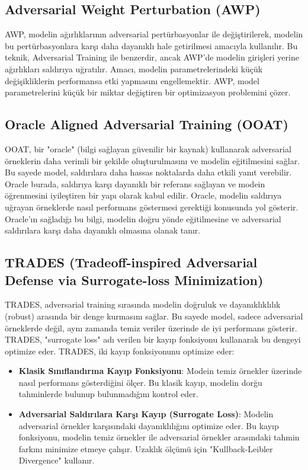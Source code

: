 \newpage

\subsection{Adversarial Weight Perturbation (AWP)}

AWP, modelin ağırlıklarının adversarial pertürbasyonlar ile değiştirilerek, modelin bu pertürbasyonlara karşı daha dayanıklı hale getirilmesi amacıyla kullanılır. Bu teknik, Adversarial Training ile benzerdir, ancak AWP'de modelin girişleri yerine ağırlıkları saldırıya uğratılır. Amacı, modelin parametrelerindeki küçük değişikliklerin performansa etki yapmasını engellemektir. AWP, model parametrelerini küçük bir miktar değiştiren bir optimizasyon problemini çözer.

\newpage

\subsection{Oracle Aligned Adversarial Training (OOAT)}

OOAT, bir "oracle" (bilgi sağlayan güvenilir bir kaynak) kullanarak adversarial örneklerin daha verimli bir şekilde oluşturulmasını ve modelin eğitilmesini sağlar. Bu sayede model, saldırılara daha hassas noktalarda daha etkili yanıt verebilir. Oracle burada, saldırıya karşı dayanıklı bir referans sağlayan ve modein öğrenmesini iyileştiren bir yapı olarak kabul edilir. Oracle, modelin saldırıya uğrayan örneklerde nasıl performans göstermesi gerektiği konusunda yol gösterir. Oracle'ın sağladığı bu bilgi, modelin doğru yönde eğitilmesine ve adversarial saldırılara karşı daha dayanıklı olmasına olanak tanır.

\newpage

\subsection{TRADES (Tradeoff-inspired Adversarial Defense via Surrogate-loss Minimization)}

TRADES, adversarial training sırasında modelin doğruluk ve dayanıklıklılık (robust) arasında bir denge kurmasını sağlar. Bu sayede model, sadece adversarial örneklerde değil, aynı zamanda temiz veriler üzerinde de iyi performans gösterir. TRADES, "surrogate loss" adı verilen bir kayıp fonksiyonu kullanarak bu dengeyi optimize eder. TRADES, iki kayıp fonksiyonunu optimize eder:

\begin{itemize}
    \item \textbf{Klasik Sınıflandırma Kayıp Fonksiyonu}: Modein temiz örnekler üzerinde nasıl performans gösterdiğini ölçer. Bu klasik kayıp, modelin dorğu tahminlerde bulunup bulunmadığını kontrol eder.
    \item \textbf{Adversarial Saldırılara Karşı Kayıp (Surrogate Loss)}: Modelin adversarial örnekler karşısındaki dayanıklılığını optimize eder. Bu kayıp fonksiyonu, modelin temiz örnekler ile adversarial örnekler arasındaki tahmin farkını minimize etmeye çalışır. Uzaklık ölçümü için "Kullback-Leibler Divergence" kullanır.
\end{itemize}

